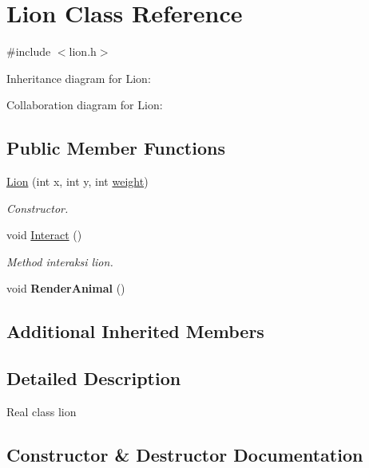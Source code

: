 \hypertarget{classLion}{}\section{Lion Class Reference}
\label{classLion}


{\ttfamily \#include $<$lion.\+h$>$}



Inheritance diagram for Lion\+:


Collaboration diagram for Lion\+:
\subsection*{Public Member Functions}
\begin{DoxyCompactItemize}
\item 
\hyperlink{classLion_ab9179fa48f72cfc584c7ebc62deb5a5e}{Lion} (int x, int y, int \hyperlink{classAnimal_a9a3b22f243f7109c57f36b3c660feb6e}{weight})
\begin{DoxyCompactList}\small\item\em Constructor. \end{DoxyCompactList}\item 
void \hyperlink{classLion_a811f481cbab35e0771bb638fcb868848}{Interact} ()\hypertarget{classLion_a811f481cbab35e0771bb638fcb868848}{}\label{classLion_a811f481cbab35e0771bb638fcb868848}

\begin{DoxyCompactList}\small\item\em Method interaksi lion. \end{DoxyCompactList}\item 
void {\bfseries Render\+Animal} ()\hypertarget{classLion_a57cd869758c7a5b99ae813698a4f9e16}{}\label{classLion_a57cd869758c7a5b99ae813698a4f9e16}

\end{DoxyCompactItemize}
\subsection*{Additional Inherited Members}


\subsection{Detailed Description}
Real class lion 

\subsection{Constructor \& Destructor Documentation}

